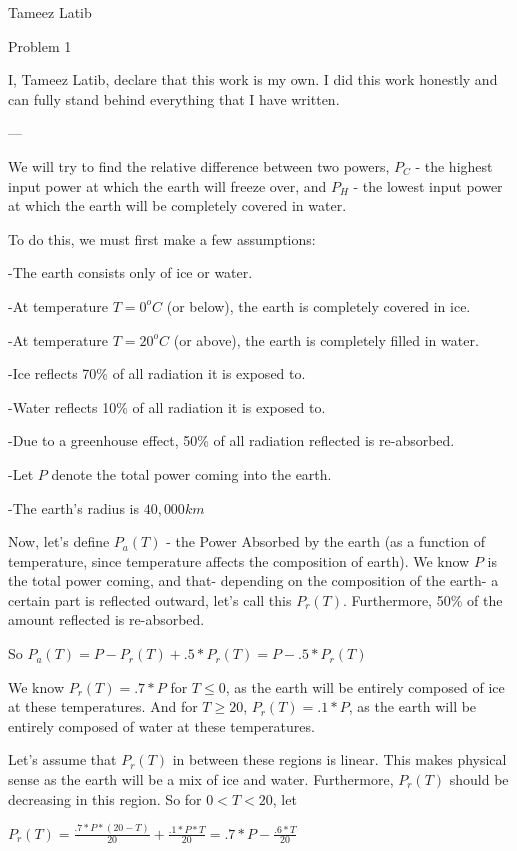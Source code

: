 \documentclass{article}
\begin{document}
Tameez Latib

Problem 1

I, Tameez Latib, declare that this work is my own. I did this work honestly and can fully stand behind everything that I have written.

---

We will try to find the relative difference between two powers, $P_C$ - the highest input power at which the earth will freeze over, and $P_H$ - the lowest input power at which the earth will be completely covered in water. 

To do this, we must first make a few assumptions:

-The earth consists only of ice or water. 

-At temperature $T=0^oC$ (or below), the earth is completely covered in ice. 

-At temperature $T=20^oC$ (or above), the earth is completely filled in water.

-Ice reflects 70\% of all radiation it is exposed to.

-Water reflects 10\% of all radiation it is exposed to.

-Due to a greenhouse effect, 50\% of all radiation reflected is re-absorbed.

-Let $P$ denote the total power coming into the earth.

-The earth's radius is $40,000km$

Now, let's define $P_a(T)$ - the Power Absorbed by the earth (as a function of temperature, since temperature affects the composition of earth). We know $P$ is the total power coming, and that- depending on the composition of the earth- a certain part is reflected outward, let's call this $P_r(T)$. Furthermore, 50\% of the amount reflected is re-absorbed. 

So $P_a(T) = P - P_r(T) + .5*P_r(T) = P - .5*P_r(T)$

We know $P_r(T) = .7*P$ for $T \le 0$, as the earth will be entirely composed of ice at these temperatures. And for $T \ge 20$, $P_r(T) = .1*P$, as the earth will be entirely composed of water at these temperatures.

Let's assume that $P_r(T)$ in between these regions is linear. This makes physical sense as the earth will be a mix of ice and water. Furthermore, $P_r(T)$ should be decreasing in this region. So for $0 < T < 20$, let 

$P_r(T)=\frac{.7*P*(20-T)}{20} +\frac{.1*P*T}{20} = .7*P - \frac{.6*T}{20}$
\end{document}
